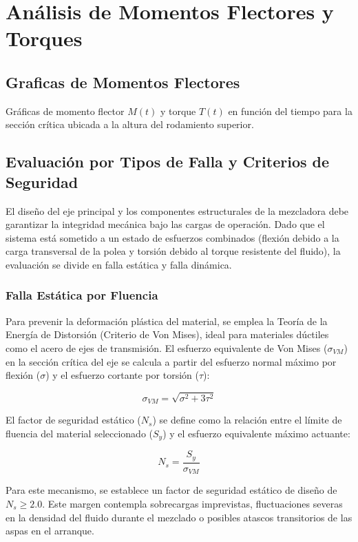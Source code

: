 \documentclass[12pt, a4paper]{article}
\begin{document}
\section{Análisis de Momentos Flectores y Torques}
\subsection{Graficas de Momentos Flectores}
Gráficas de momento flector \texorpdfstring{$M(t)$}{M(t)} y torque \texorpdfstring{$T(t)$}{T(t)} en función del tiempo para la sección crítica ubicada a la altura del rodamiento superior.

\subsection{Evaluación por Tipos de Falla y Criterios de Seguridad}

El diseño del eje principal y los componentes estructurales de la mezcladora debe garantizar la integridad mecánica bajo las cargas de operación. Dado que el sistema está sometido a un estado de esfuerzos combinados (flexión debido a la carga transversal de la polea y torsión debido al torque resistente del fluido), la evaluación se divide en falla estática y falla dinámica.

\subsubsection{Falla Estática por Fluencia}
Para prevenir la deformación plástica del material, se emplea la Teoría de la Energía de Distorsión (Criterio de Von Mises), ideal para materiales dúctiles como el acero de ejes de transmisión. El esfuerzo equivalente de Von Mises ($\sigma_{VM}$) en la sección crítica del eje se calcula a partir del esfuerzo normal máximo por flexión ($\sigma$) y el esfuerzo cortante por torsión ($\tau$):

\begin{equation}
    \sigma_{VM} = \sqrt{\sigma^2 + 3\tau^2}
\end{equation}

El factor de seguridad estático ($N_s$) se define como la relación entre el límite de fluencia del material seleccionado ($S_y$) y el esfuerzo equivalente máximo actuante:

\begin{equation}
    N_s = \frac{S_y}{\sigma_{VM}}
\end{equation}

Para este mecanismo, se establece un factor de seguridad estático de diseño de $N_s \geq 2.0$. Este margen contempla sobrecargas imprevistas, fluctuaciones severas en la densidad del fluido durante el mezclado o posibles atascos transitorios de las aspas en el arranque.
\end{document}
